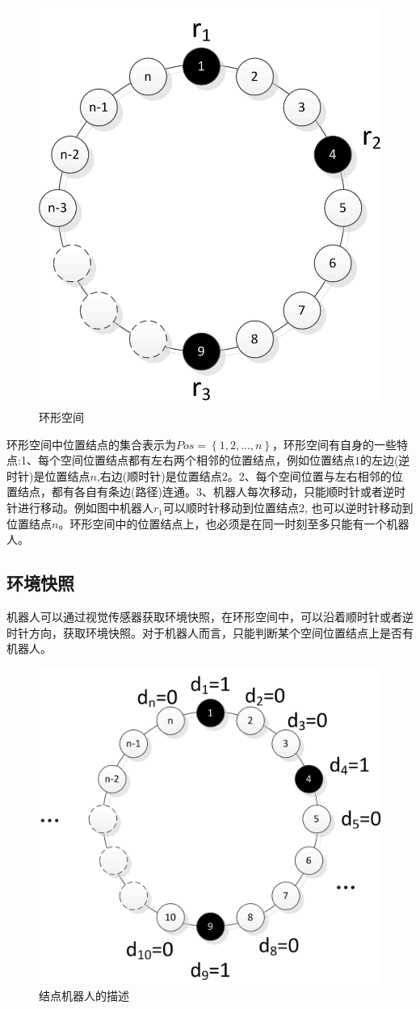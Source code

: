 \begin{figure}[!hbt]
	\centering
	\includegraphics[width=2 in]{fig/ring1.png}
	\caption{环形空间}
	\label{fig:ring1}
\end{figure}

环形空间中位置结点的集合表示为$Pos =\left\{1,2,...,n\right\}$，环形空间有自身的一些特点:1、每个空间位置结点都有左右两个相邻的位置结点，例如位置结点$1$的左边(逆时针)是位置结点$n$,右边(顺时针)是位置结点$2$。2、每个空间位置与左右相邻的位置结点，都有各自有条边(路径)连通。3、机器人每次移动，只能顺时针或者逆时针进行移动。例如图中机器人$r_1$可以顺时针移动到位置结点$2$, 也可以逆时针移动到位置结点$n$。环形空间中的位置结点上，也必须是在同一时刻至多只能有一个机器人。

\subsection{环境快照}
机器人可以通过视觉传感器获取环境快照，在环形空间中，可以沿着顺时针或者逆时针方向，获取环境快照。对于机器人而言，只能判断某个空间位置结点上是否有机器人。

\begin{figure}[!hbt]
	\centering
	\includegraphics[width=3.5 in]{fig/snapshot1.png}
	\caption{结点机器人的描述}
	\label{fig:snapshot1}
\end{figure}

